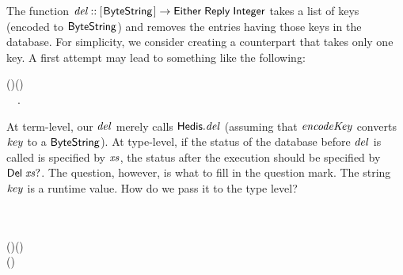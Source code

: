 The \Hedis{} function \ensuremath{\Varid{del}\mathbin{::}[\mskip1.5mu \Conid{ByteString}\mskip1.5mu]\to \Conid{Either}\;\Conid{Reply}\;\Conid{Integer}} takes a list
of keys (encoded to \ensuremath{\Conid{ByteString}}) and removes the entries having those keys in
the database. For simplicity, we consider creating a \Popcorn{} counterpart
that takes only one key. A first attempt may lead to something like the
following:
\begin{hscode}\SaveRestoreHook
{}%
%
\>[B]{}\mathbin{::}\to {}\;\;(\;)\;(\;\;){}\<[E]%
\\
\>[B]{}\;\mathrel{=}\mathbin{\$}~~.{}\<[E]%
\ColumnHook
\end{hscode}\resethooks
At term-level, our \ensuremath{\Varid{del}} merely calls \ensuremath{\Varid{\Conid{Hedis}.del}} (assuming that \ensuremath{\Varid{encodeKey}}
converts \ensuremath{\Varid{key}} to a \ensuremath{\Conid{ByteString}}). At type-level, if the status of the database
before \ensuremath{\Varid{del}} is called is specified by \ensuremath{\Varid{xs}}, the status after the execution
should be specified by \ensuremath{\Conid{Del}\;\Varid{xs}\mathbin{?}}. The question, however, is what to fill in
the question mark. The string \ensuremath{\Varid{key}} is a runtime value. How do we pass it to
the type level?


\begin{hscode}\SaveRestoreHook
{}%
%
%
\>[B]{}\mathbin{::}\;\<[E]%
\\
\>[B]{}\<[5]%
\>[5]{}\Rightarrow {}\;\<[E]%
\\
\>[B]{}\<[5]%
\>[5]{}\to {}\;\;(\;\;)\;(\;\;){}\<[E]%
\\
\>[B]{}\;\mathrel{=}\mathbin{\$}\;(\;){}\<[E]%
\ColumnHook
\end{hscode}\resethooks

